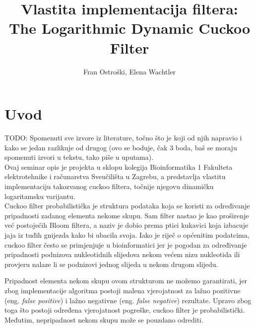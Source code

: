 \documentclass[times, utf8, seminar, numeric]{fer}
\begin{document}
\nocite{*}

\title{Vlastita implementacija filtera: \protect\\ The Logarithmic Dynamic Cuckoo Filter}

\author{Fran Ostroški, Elena Wachtler}


\maketitle

\tableofcontents

\chapter{Uvod}

TODO: Spomenuti sve izvore iz literature, točno što je koji od njih napravio i kako se jedan razlikuje od drugog (ovo se boduje, čak 3 boda, baš se moraju spomenuti izvori u tekstu, tako piše u uputama). \\

Ovaj seminar opis je projekta u sklopu kolegija Bioinformatika 1 Fakulteta elektrotehnike i računarstva Sveučilišta u Zagrebu, a predstavlja vlastitu implementaciju takozvanog cuckoo filtera, točnije njegovu dinamičku logaritamsku varijantu. \\

Cuckoo filter probabilistička je struktura podataka koja se koristi za određivanje pripadnosti zadanog elementa nekome skupu. Sam filter nastao je kao proširenje već postojećih Bloom filtera, a naziv je dobio prema ptici kukavici koja izbacuje jaja iz tuđih gnijezda kako bi ubacila svoja. Iako je riječ o općenitim podatcima, cuckoo filter često se primjenjuje u bioinformatici jer je pogodan za određivanje pripadnosti podnizova nukleotidnih slijedova nekom većem nizu nukleotida ili provjeru nalaze li se podnizovi jednog slijeda u nekom drugom slijedu.

Pripadnost elementa nekom skupu ovom strukturom ne možemo garantirati, jer zbog implementacije algoritma postoji malena vjerojatnost za lažno pozitivne (eng. \textit{false positive}) i lažno negativne (eng. \textit{false negative}) rezultate. Upravo zbog toga što postoji određena vjerojatnost pogreške, cuckoo filter je probabilistički. Međutim, nepripadnost nekom skupu može se pouzdano odrediti. \\
\end{document}
